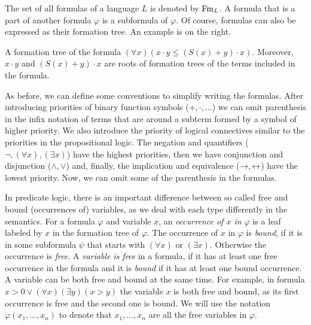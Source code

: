The set of all formulas of a language $L$ is denoted by $\operatorname{Fm}_L$. A formula that is a part of another formula $\varphi$ is a subformula of $\varphi$. Of course, formulas can also be expressed as their formation tree. An example is on the right.

\begin{marginfigure}[-6\baselineskip]
\centering
{}
\caption{A formation tree of the formula $(\forall x) (x \cdot y \leq (S(x) + y)\cdot x)$. Moreover, $x\cdot y$ and $(S(x) + y)\cdot x$ are roots of formation trees of the terms included in the formula.}
\end{marginfigure}

As before, we can define some conventions to simplify writing the formulas. After introducing priorities of binary function symbols ($+, \cdot, \dots$) we can omit parenthesis in the infix notation of terms that are around a subterm formed by a symbol of higher priority. We also introduce the priority of logical connectives similar to the priorities in the propositional logic. The negation and quantifiers ($\neg, (\forall x), (\exists x)$) have the highest priorities, then we have conjunction and disjunction ($\land, \lor$) and, finally, the implication and equivalence ($\to, \leftrightarrow$) have the lowest priority. Now, we can omit some of the parenthesis in the formulas.

In predicate logic, there is an important difference between so called free and bound (occurrences of) variables, as we deal with each type differently in the semantics. For a formula $\varphi$ and variable $x$, an \emph{occurrence of $x$ in $\varphi$} is a leaf labeled by $x$ in the formation tree of $\varphi$. The occurrence of $x$ in $\varphi$ is \emph{bound}, if it is in some subformula $\psi$ that starts with $(\forall x)$ or $(\exists x)$. Otherwise the occurrence is \emph{free}. A \emph{variable is free} in a formula, if it has at least one free occurrence in the formula and it is \emph{bound} if it has at least one bound occurrence. A variable can be both free and bound at the same time. For example, in formula $x > 0 \lor (\forall x) (\exists y)(x > y)$ the variable $x$ is both free and bound, as its first occurrence is free and the second one is bound. We will use the notation $\varphi(x_1, \dots, x_n)$ to denote that $x_1, \dots, x_n$ are all the free variables in $\varphi$.

